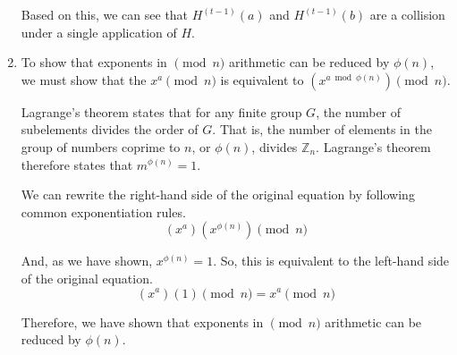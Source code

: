 \documentclass[12pt,letterpaper]{article}
\begin{document}
\begin{enumerate}
    Based on this, we can see that $H^{(t-1)}(a)$ and $H^{(t-1)}(b)$ are a
    collision under a single application of $H$.

  \item To show that exponents in $\pmod{n}$ arithmetic can be reduced by
    $\phi(n)$, we must show that the $x^a \pmod{n}$ is equivalent to $(x^{a
    \bmod{\phi(n)}}) \pmod{n}$.
    
    Lagrange's theorem states that for any finite group $G$, the number of
    subelements divides the order of $G$. That is, the number of elements in the
    group of numbers coprime to $n$, or $\phi(n)$, divides $\mathbb{Z}_n$.
    Lagrange's theorem therefore states that $m^{\phi(n)} = 1$.

    We can rewrite the right-hand side of the original equation by following
    common exponentiation rules.
    $$
      (x^a)(x^{\phi(n)}) \pmod{n}
    $$

    And, as we have shown, $x^{\phi(n)} = 1$. So, this is equivalent to the
    left-hand side of the original equation.
    $$
      (x^a)(1) \pmod{n} = x^a \pmod{n}
    $$

    Therefore, we have shown that exponents in $\pmod{n}$ arithmetic can be
    reduced by $\phi(n)$.

\end{enumerate}
\end{document}
